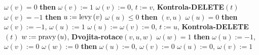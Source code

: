 \phantom{---}{\bf if} $\omega \left(v\right)=0$ {\bf then}\newline 
\phantom{------}$\omega \left(v\right):=1$\newline 
\phantom{---}{\bf else}\newline 
\phantom{------}$\omega \left(v\right):=0$, $t:=v$, {\bf Kontrola-DELETE}$\left(t\right)$\newline \phantom{---}{\bf endif\newline 
else}\newline 
\phantom{---}{\bf if} $\omega \left(v\right)=-1$ {\bf then}\newline 
\phantom{------}$u:=\operatorname{levy}\left(v\right)$\newline 
\phantom{------}{\bf if} $\omega \left(u\right)\le 0$ {\bf then}\newline 
\phantom{---------}{\bf Rotace}$\left(v,u\right)$\newline 
\phantom{---------}{\bf if} $\omega \left(u\right)=0$ {\bf then}\newline 
\phantom{------------}$\omega \left(v\right):=-1$, $\omega \left(u\right):=1$\newline 
\phantom{---------}{\bf else}\newline 
\phantom{------------}$\omega \left(u\right):=\omega \left(v\right):=0$, $t:=u$, {\bf Kontrola-DELETE}$\left(t\right)$\newline 
\phantom{---------}{\bf endif}\newline 
\phantom{------}{\bf else}\newline 
\phantom{---------}$w:=\operatorname{pravy}\left(u\right)$, {\bf Dvojita-rotace$\left(v,u,w\right)$}\newline 
\phantom{---------}{\bf if} $\omega \left(w\right)=1$ {\bf then}\newline 
\phantom{------------}$\omega \left(u\right):=-1$, $\omega \left(v\right):=0$\newline 
\phantom{---------}{\bf else}\newline 
\phantom{------------}{\bf if} $\omega \left(w\right):=0$ {\bf then}\newline 
\phantom{---------------}$\omega \left(u\right):=0$, $\omega\left(v\right):=0$\newline 
\phantom{------------}{\bf else}\newline 
\phantom{---------------}$\omega \left(u\right):=0$, $\omega \left(v\right):=1$\newline 
\phantom{------------}{\bf endif}\newline 
\phantom{---------}{\bf endif}\newline 
